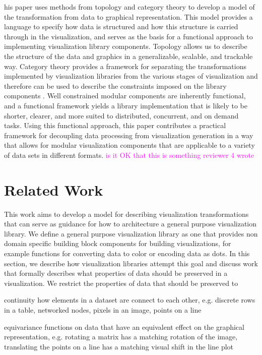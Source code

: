 \documentclass[10pt,journal,compsoc]{IEEEtran}
\newcommand{\note}[1]{\textcolor{magenta}{#1}}
\theoremstyle{definition}
\theoremstyle{remark}
\begin{document}
his paper uses methods from topology and category theory to develop a model of the transformation from data to graphical representation. This model provides a language to specify how data is structured and how this structure is carried through in the visualization, and serves as the basis for a functional approach to implementing visualization library components. Topology allows us to describe the structure of the data and graphics in a generalizable, scalable, and trackable way. Category theory provides a framework for separating the transformations implemented by visualization libraries from the various stages of visualization and therefore can be used to describe the constraints imposed on the library components \cite{wielsManagementEvolvingSpecifications1998,goguenCategoricalManifesto1991}. Well constrained modular components are inherently functional\cite{hughesWhyFunctionalProgramming1989}, and a functional framework yields a library implementation that is likely to be shorter, clearer, and more suited to distributed, concurrent, and on demand tasks\cite{huHowFunctionalProgramming2015}. Using this functional approach, this paper contributes a practical framework for decoupling data processing from visualization generation in a way that allows for modular visualization components that are applicable to a variety of data sets in different formats. \note{is it OK that this is something reviewer 4 wrote}



\section{Related Work}
This work aims to develop a model for describing visualization transformations that can serve as guidance for how to architecture a general purpose visualization library. We define a general purpose visualization library as one that provides non domain specific building block components\cite{wongsuphasawatNavigatingWideWorld2021} for building visualizations, for example functions for converting data to color or encoding data as dots. In this section, we describe how visualization libraries attempt this goal and discuss work that formally describes what properties of data should be preserved in a visualization. We restrict the properties of data that should be preserved to 

\begin{LaTeXdescription}
  \item [continuity] how elements in a dataset are connect to each other, e.g. discrete rows in a table, networked nodes, pixels in an image, points on a line
  \item [equivariance] functions on data that have an equivalent effect on the graphical representation, e.g. rotating a matrix has a matching rotation of the image, translating the points on a line has a matching visual shift in the line plot
\end{LaTeXdescription}
\end{document}
